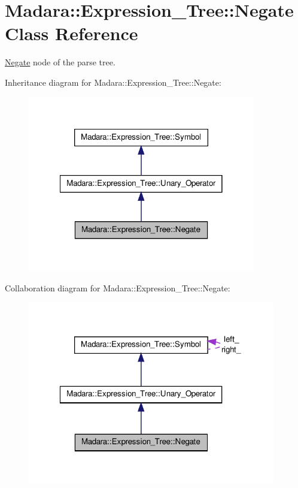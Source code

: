 \hypertarget{classMadara_1_1Expression__Tree_1_1Negate}{
\section{Madara::Expression\_\-Tree::Negate Class Reference}
\label{d8/dad/classMadara_1_1Expression__Tree_1_1Negate}
}


\hyperlink{classMadara_1_1Expression__Tree_1_1Negate}{Negate} node of the parse tree.  




Inheritance diagram for Madara::Expression\_\-Tree::Negate:
\nopagebreak
\begin{figure}[H]
\begin{center}
\leavevmode
\includegraphics[width=282pt]{db/db0/classMadara_1_1Expression__Tree_1_1Negate__inherit__graph}
\end{center}
\end{figure}


Collaboration diagram for Madara::Expression\_\-Tree::Negate:
\nopagebreak
\begin{figure}[H]
\begin{center}
\leavevmode
\includegraphics[width=307pt]{d5/dc3/classMadara_1_1Expression__Tree_1_1Negate__coll__graph}
\end{center}
\end{figure}
